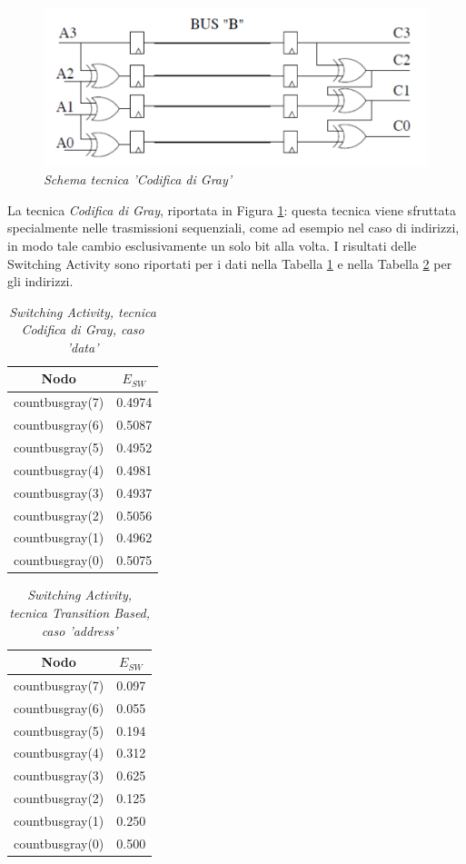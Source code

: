 \begin{figure}[!htb]
	\centering
	\includegraphics[scale=1]{immagini/gray}
	\caption{\textit{Schema tecnica 'Codifica di Gray'}}
	\label{gray}
\end{figure}
\newpage
\noindent La tecnica \textit{Codifica di Gray}, riportata in Figura \ref{gray}: questa tecnica viene sfruttata specialmente nelle trasmissioni sequenziali, come ad esempio nel caso di indirizzi, in modo tale cambio esclusivamente un solo bit alla volta. I risultati delle Switching Activity sono riportati per i dati nella Tabella \ref{Tab7} e nella Tabella \ref{Tab8} per gli indirizzi. \\
\begin{table}[!h]\footnotesize
	\centering
	\begin{tabular}{|c|c|}
		\hline
		\textbf{Nodo} & \textbf{$E_{SW}$}\\
		\hline
		countbusgray(7) & 0.4974\\
		countbusgray(6) & 0.5087\\
		countbusgray(5) & 0.4952\\
		countbusgray(4) & 0.4981\\
		countbusgray(3) & 0.4937\\
		countbusgray(2) & 0.5056\\
		countbusgray(1) & 0.4962\\
		countbusgray(0) & 0.5075\\
		\hline
	\end{tabular}
	\caption{\textit{Switching Activity, tecnica Codifica di Gray, caso 'data'}}
	\label{Tab7}
\end{table}
\begin{table}[!h]\footnotesize
	\centering
	\begin{tabular}{|c|c|}
		\hline
		\textbf{Nodo} & \textbf{$E_{SW}$}\\
		\hline
		countbusgray(7) & 0.097\\
		countbusgray(6) & 0.055\\
		countbusgray(5) & 0.194\\
		countbusgray(4) & 0.312\\
		countbusgray(3) & 0.625\\
		countbusgray(2) & 0.125\\
		countbusgray(1) & 0.250\\
		countbusgray(0) & 0.500\\
		\hline
	\end{tabular}
	\caption{\textit{Switching Activity, tecnica Transition Based, caso 'address'}}
	\label{Tab8}
\end{table}
